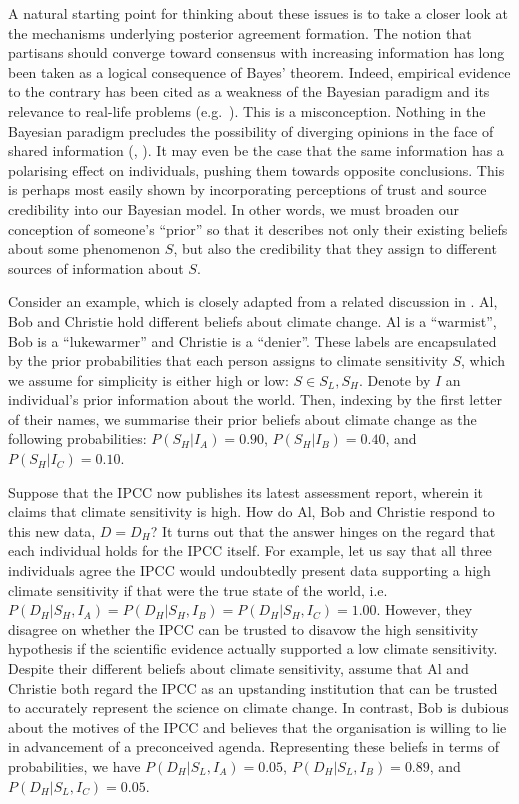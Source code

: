 \documentclass[smallextended]{svjour3}       %
\begin{document}
A natural starting point for thinking about these issues is to take a
closer look at the mechanisms underlying posterior agreement formation.
The notion that partisans should converge toward consensus with
increasing information has long been taken as a logical consequence of
Bayes' theorem. Indeed, empirical evidence to the contrary has been
cited as a weakness of the Bayesian paradigm and its relevance to
real-life problems (e.g.~\cite{kahneman1972subjective}). This is a
misconception. Nothing in the Bayesian paradigm precludes the
possibility of diverging opinions in the face of shared information
(\cite{jaynes2003probability}, \cite{bullock2009partisan}). It may even
be the case that the same information has a polarising effect on
individuals, pushing them towards opposite conclusions. This is perhaps
most easily shown by incorporating perceptions of trust and source
credibility into our Bayesian model. In other words, we must broaden our
conception of someone's ``prior'' so that it describes not only their
existing beliefs about some phenomenon \(S\), but also the credibility
that they assign to different sources of information about \(S\).

Consider an example, which is closely adapted from a related discussion
in \cite{jaynes2003probability}. Al, Bob and Christie hold different
beliefs about climate change. Al is a ``warmist'', Bob is a
``lukewarmer'' and Christie is a ``denier''. These labels are
encapsulated by the prior probabilities that each person assigns to
climate sensitivity \(S\), which we assume for simplicity is either high
or low: \(S \in {S_L, S_H}\). Denote by \(I\) an individual's prior
information about the world. Then, indexing by the first letter of their
names, we summarise their prior beliefs about climate change as the
following probabilities: \(P(S_H|I_A)=0.90\), \(P(S_H|I_B)=0.40\), and
\(P(S_H|I_C)=0.10\).

Suppose that the IPCC now publishes its latest assessment report,
wherein it claims that climate sensitivity is high. How do Al, Bob and
Christie respond to this new data, \(D=D_H\)? It turns out that the
answer hinges on the regard that each individual holds for the IPCC
itself. For example, let us say that all three individuals agree the
IPCC would undoubtedly present data supporting a high climate
sensitivity if that were the true state of the world,
i.e.~\(P(D_H|S_H,I_A) = P(D_H|S_H,I_B) = P(D_H|S_H,I_C) = 1.00\).
However, they disagree on whether the IPCC can be trusted to disavow the
high sensitivity hypothesis if the scientific evidence actually
supported a low climate sensitivity. Despite their different beliefs
about climate sensitivity, assume that Al and Christie both regard the
IPCC as an upstanding institution that can be trusted to accurately
represent the science on climate change. In contrast, Bob is dubious
about the motives of the IPCC and believes that the organisation is
willing to lie in advancement of a preconceived agenda. Representing
these beliefs in terms of probabilities, we have
\(P(D_H|S_L,I_A) = 0.05\), \(P(D_H|S_L,I_B) = 0.89\), and
\(P(D_H|S_L,I_C) = 0.05\).
\end{document}
